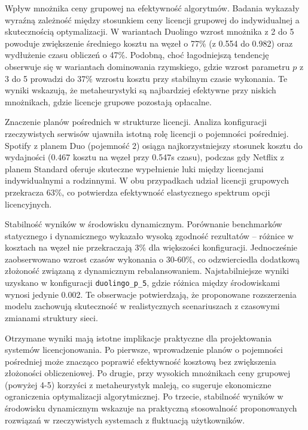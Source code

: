 Wpływ mnożnika ceny grupowej na efektywność algorytmów. Badania wykazały wyraźną zależność między stosunkiem ceny licencji grupowej do indywidualnej a skutecznością optymalizacji. W wariantach Duolingo wzrost mnożnika z 2 do 5 powoduje zwiększenie średniego kosztu na węzeł o 77\% (z 0.554 do 0.982) oraz wydłużenie czasu obliczeń o 47\%. Podobną, choć łagodniejszą tendencję obserwuje się w wariantach dominowania rzymskiego, gdzie wzrost parametru $p$ z 3 do 5 prowadzi do 37\% wzrostu kosztu przy stabilnym czasie wykonania. Te wyniki wskazują, że metaheurystyki są najbardziej efektywne przy niskich mnożnikach, gdzie licencje grupowe pozostają opłacalne.

Znaczenie planów pośrednich w strukturze licencji. Analiza konfiguracji rzeczywistych serwisów ujawniła istotną rolę licencji o pojemności pośredniej. Spotify z planem Duo (pojemność 2) osiąga najkorzystniejszy stosunek kosztu do wydajności (0.467 kosztu na węzeł przy 0.547s czasu), podczas gdy Netflix z planem Standard oferuje skuteczne wypełnienie luki między licencjami indywidualnymi a rodzinnymi. W obu przypadkach udział licencji grupowych przekracza 63\%, co potwierdza efektywność elastycznego spektrum opcji licencyjnych.

Stabilność wyników w środowisku dynamicznym. Porównanie benchmarków statycznego i dynamicznego wykazało wysoką zgodność rezultatów -- różnice w kosztach na węzeł nie przekraczają 3\% dla większości konfiguracji. Jednocześnie zaobserwowano wzrost czasów wykonania o 30-60\%, co odzwierciedla dodatkową złożoność związaną z dynamicznym rebalansowaniem. Najstabilniejsze wyniki uzyskano w konfiguracji \texttt{duolingo\_p\_5}, gdzie różnica między środowiskami wynosi jedynie 0.002. Te obserwacje potwierdzają, że proponowane rozszerzenia modelu zachowują skuteczność w realistycznych scenariuszach z czasowymi zmianami struktury sieci.

Otrzymane wyniki mają istotne implikacje praktyczne dla projektowania systemów licencjonowania. Po pierwsze, wprowadzenie planów o pojemności pośredniej może znacząco poprawić efektywność kosztową bez zwiększenia złożoności obliczeniowej. Po drugie, przy wysokich mnożnikach ceny grupowej (powyżej 4-5) korzyści z metaheurystyk maleją, co sugeruje ekonomiczne ograniczenia optymalizacji algorytmicznej. Po trzecie, stabilność wyników w środowisku dynamicznym wskazuje na praktyczną stosowalność proponowanych rozwiązań w rzeczywistych systemach z fluktuacją użytkowników.
